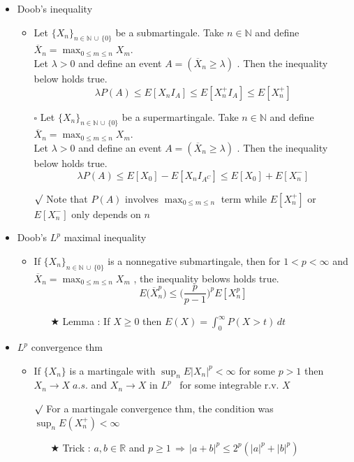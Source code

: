 \documentclass[12pt, A4]{article}
\newcommand{\sq}{$\square$}
\newcommand{\rmk}{$\surd$}
\newcommand{\trick}{$\bigstar$}
\newcommand{\N}{\mathbb{N}}
\newcommand{\R}{\mathbb{R}}
\newcommand{\union}{\,\cup\,}
\begin{document}
\begin{itemize}
\begin{itemize}
	\end{itemize}
	\item Doob's inequality
	\begin{itemize}
		\item Let $\{X_n\}_{n\in \N\union \{0\} }$ be a submartingale. Take $n\in \N$ and define $\overline{X}_n=\max_{0\leq m \leq n}X_m$. \\ Let $\lambda>0$ and define an event $A=(\overline{X}_n\geq \lambda)$ . Then the inequality below holds true.
		$$
			\lambda P(A)\leq E[X_nI_A]\leq E[X_n^+ I_A]\leq E[X_n^+]
		$$
		\item[\sq] Let $\{X_n\}_{n\in \N\union \{0\} }$ be a supermartingale. Take $n\in \N$ and define $\overline{X}_n=\max_{0\leq m \leq n}X_m$. \\ Let $\lambda>0$ and define an event $A=(\overline{X}_n\geq \lambda)$ . Then the inequality below holds true.
		$$
			\lambda P(A)\leq E[X_0]-E[X_n I_{A^C}]\leq E[X_0]+E[X_n^-]
		$$ 
		\item[\rmk] Note that $P(A)$ involves $\max_{0\leq m \leq n}$ term while $E[X_n^+]$ or $E[X_n^-]$ only depends on $n$
	\end{itemize}
	\item Doob's $L^p$ maximal inequality
	\begin{itemize}
		\item If $\{X_n\}_{n\in \N\union \{0\} }$ is a nonnegative submartingale, then for $1<p<\infty$ and \\ $\overline{X}_n=\max_{0\leq m \leq n}X_m$ , the inequality belows holds true. 
		$$
			E\big(\overline{X}_n^p\big)\leq \Big(\frac{p}{p-1}\Big)^p E[X_n^p]
		$$
		\begin{itemize}
			\item[\trick] Lemma : If $X\geq 0$ then $E(X)=\int_0^\infty P(X>t)\, dt$
		\end{itemize}
	\end{itemize}
	\item $L^p$ convergence thm
	\begin{itemize}
		\item If $\{X_n\}$ is a martingale with $\sup_n E|X_n|^p<\infty$ for some $p>1$ then $X_n\rightarrow X\; a.s.$ and $X_n\rightarrow X$ in $L^p$ \, for some integrable r.v. $X$
		\item[\rmk] For a martingale convergence thm, the condition was $\sup_n E(X_n^+)<\infty$
		\begin{itemize}
			\item[\trick] Trick : $a,b\in \R$ and $p\geq 1\,\Rightarrow\, |a+b|^p\leq 2^p(|a|^p+|b|^p)$  

\end{itemize}
\end{itemize}
\end{itemize}
\end{document}
